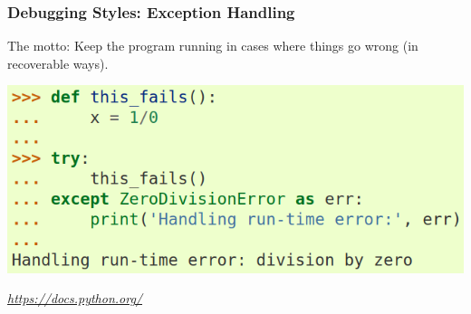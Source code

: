 \documentclass[unknownkeysallowed]{beamer}
\begin{document}
\begin{frame}
\frametitle{Debugging Styles: Exception Handling}
	\begin{center}
	The motto: Keep the program running in cases where things go wrong (in recoverable ways).
	\end{center}
	\begin{center}
		\includegraphics[width=.8\textwidth]{../figures/python_exception_handling.png}	
	\end{center}
	\begin{flushleft}
	\tiny{\emph{\url{https://docs.python.org/}}}
	\end{flushleft}	
\end{frame}
\end{document}
